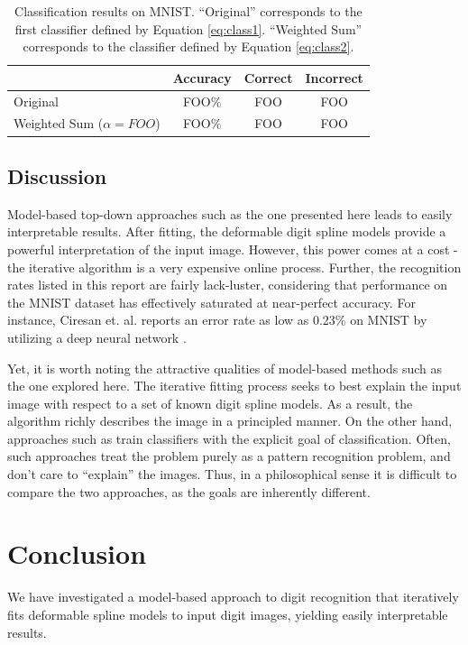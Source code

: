 \documentclass[oribibl]{llncs}
\begin{document}
\begin{table}
\centering
  \begin{tabular}{ l || c | c | c }
  & Accuracy & Correct & Incorrect \\ \hline
    Original &  FOO\% & FOO & FOO \\ \hline
    Weighted Sum ($\alpha = FOO$) & FOO\% & FOO & FOO \\
  \end{tabular}
\vspace{1em}
\caption{Classification results on MNIST. ``Original'' corresponds to the first classifier defined by Equation \ref{eq:class1}. ``Weighted Sum'' corresponds to the classifier defined by Equation \ref{eq:class2}.}
\label{tab:results}
\end{table}



\subsection{Discussion}

Model-based top-down approaches such as the one presented here leads to easily interpretable results.
After fitting, the deformable digit spline models provide a powerful interpretation of the input image.
However, this power comes at a cost - the iterative algorithm is a very expensive online process.
Further, the recognition rates listed in this report are fairly lack-luster, considering that performance on the MNIST dataset has effectively saturated at near-perfect accuracy.
For instance, Ciresan et. al. reports an error rate as low as 0.23\% on MNIST by utilizing a deep neural network \cite{ciresan}.

Yet, it is worth noting the attractive qualities of model-based methods such as the one explored here.  
The iterative fitting process seeks to best explain the input image with respect to a set of known digit spline models.
As a result, the algorithm richly describes the image in a principled manner.
On the other hand, approaches such as \cite{ciresan} train classifiers with the explicit goal of classification.
Often, such approaches treat the problem purely as a pattern recognition problem, and don't care to ``explain'' the images.
Thus, in a philosophical sense it is difficult to compare the two approaches, as the goals are inherently different.

\section{Conclusion}

We have investigated a model-based approach to digit recognition that iteratively fits deformable spline models to input digit images, yielding easily interpretable results.


 

\end{document}
